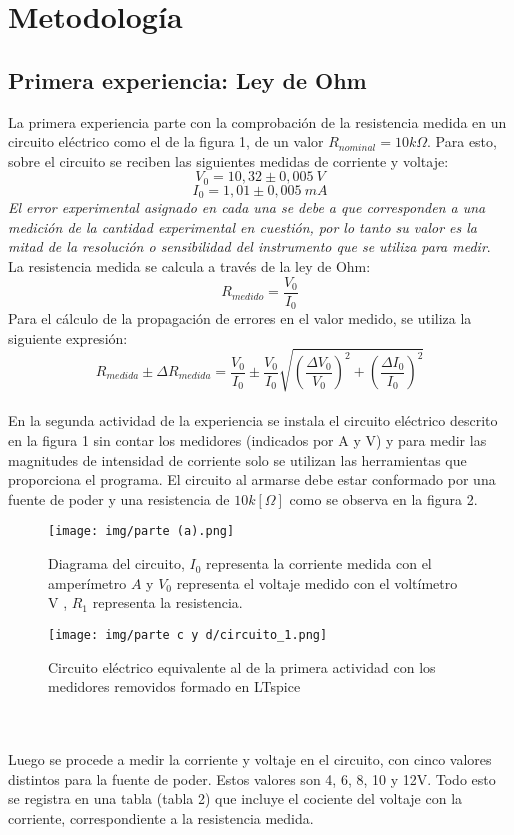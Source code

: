 \documentclass[letterpaper,11pt]{article} %
\begin{document}
\section{Metodología}
\subsection{Primera experiencia: Ley de Ohm}
La primera experiencia parte con la comprobación de la resistencia medida en un circuito eléctrico como el de la figura 1, de un valor $R_{nominal}=10k\Omega$. Para esto, sobre el circuito se reciben las siguientes medidas de corriente y voltaje:
$$V_0=10,32 \pm 0,005~V$$ $$I_0=1,01\pm0,005~mA$$
{\textit{El error experimental asignado en cada una se debe a que corresponden a una medición de la cantidad experimental en cuestión, por lo tanto su valor es la mitad de la resolución o sensibilidad del instrumento que se utiliza para medir}}. \\
La resistencia medida se calcula a través de la ley de Ohm: $$ R_{medido}=\frac{V_0}{I_0}$$
Para el cálculo de la propagación de errores en el valor medido, se utiliza la siguiente expresión:
$$R_{medida}\pm \Delta R_{medida}=\frac{V_0}{I_0}\pm \frac{V_0}{I_0}
\sqrt{\left (\frac{\Delta V_0}{V_0}  \right )^2+\left (\frac{\Delta I_0}{I_0}  \right )^2} $$
\\
En la segunda actividad de la experiencia se instala el circuito eléctrico descrito en la figura 1 sin contar los medidores (indicados por A y V) y para medir las magnitudes de intensidad de corriente solo se utilizan las herramientas que proporciona el programa. El circuito al armarse debe estar conformado por una fuente de poder y una resistencia de $10k[\Omega]$ como se observa en la figura 2.

\begin{figure}[H]
\caption{Diagrama del circuito, $I_0$ representa la corriente medida con el amperímetro $A$ y $V_0$ representa
el voltaje medido con el voltímetro V , $R_1$ representa la resistencia.}
\centering
\texttt{[image: img/parte (a).png]}
\end{figure}

\begin{figure}[H]
\caption{Circuito eléctrico equivalente al de la primera actividad con los medidores removidos formado en LTspice}
\centering
\texttt{[image: img/parte c y d/circuito\_1.png]}
\end{figure}
\\ \\
Luego se procede a medir la corriente y voltaje en el circuito, con cinco valores distintos para la fuente de poder. Estos valores son 4, 6, 8, 10 y 12V. Todo esto se registra en una tabla (tabla 2) que incluye el cociente del voltaje con la corriente, correspondiente a la resistencia medida.
\\  \\
\end{document}
